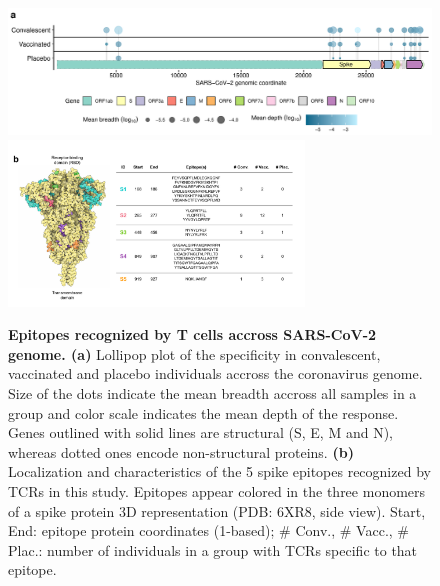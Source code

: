 \begin{figure}[!t]
	\centering
	\includegraphics[width=\textwidth,keepaspectratio]{figures/hits.pdf}
	\includegraphics[width=0.7\textwidth,keepaspectratio]{figures/spike_w_table.pdf}
	\caption{\textbf{Epitopes recognized by T cells accross SARS-CoV-2 genome. (a)} Lollipop plot of the \TCRB{} \covid{} specificity in convalescent, vaccinated and placebo individuals accross the coronavirus genome. Size of the dots indicate the mean breadth accross all samples in a group and color scale indicates the mean depth of the response. Genes outlined with solid lines are structural (S, E, M and N), whereas dotted ones encode non-structural proteins. \textbf{(b)} Localization and characteristics of the 5 \covid{} spike epitopes recognized by TCRs in this study. Epitopes appear colored in the three monomers of a spike protein 3D representation (PDB: 6XR8, side view). Start, End: epitope protein coordinates (1-based); \# Conv., \# Vacc., \# Plac.: number of individuals in a group with TCRs specific to that epitope.}
	\label{fig:hits}
\end{figure}

